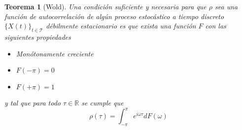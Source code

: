 \documentclass[12pt,letterpaper]{book}
\newtheorem{teorema}{Teorema}[chapter]
\newcommand{\R}{\mathbb{R}}
\newcommand{\intPI}{\int_{-\pi}^{\pi}}
\newcommand{\xt}{$\{X(t)\}_{t\in \mathcal{T}}$ }
\begin{document}
\begin{teorema}[Wold]
Una condición suficiente y necesaria para que $\rho$ sea una función de autocorrelación de 
algún proceso estocástico a tiempo discreto \xt débilmente estacionario es que exista 
una función $F$ con las siguientes propiedades
\begin{itemize}
\item Monótonamente creciente
\item $F(-\pi) = 0$
\item $F(+\pi) = 1$
\end{itemize}
y tal que para todo $\tau \in \R$ se cumple que
\begin{equation*}
\rho(\tau) = \intPI e^{i \omega \tau} dF(\omega)
\end{equation*}
\label{t_wold}
\end{teorema}
\end{document}
